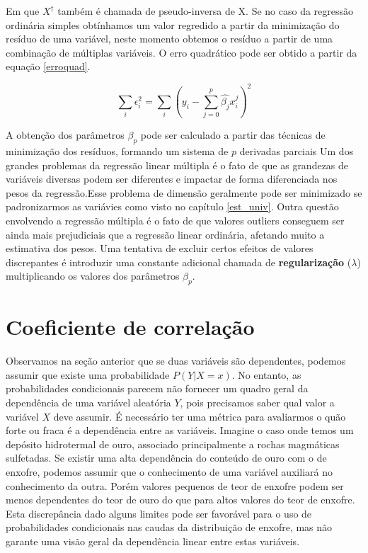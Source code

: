 Em que $X^{\dagger}$ também é chamada de pseudo-inversa de X. Se no caso da regressão ordinária simples obtínhamos um valor regredido a partir da minimização do resíduo de uma variável, neste momento obtemos o resíduo a partir de uma combinação de múltiplas variáveis. O erro quadrático pode ser obtido a partir da equação \eqref{erroquad}. 
  
 
 \begin{equation}\label{erroquad}
 \sum_{i} \epsilon_{i}^2 = \sum_{i} \left( y_{i} - \sum_{j=0}^{p} \hat{\beta_{j}} x^{j}_{i} \right)^{2}
 \end{equation}
 
A obtenção dos parâmetros $\beta_{p}$ pode ser calculado a partir das técnicas de minimização dos resíduos, formando um sistema de $p$ derivadas parciais Um dos grandes problemas da regressão linear múltipla é o fato de que as grandezas de variáveis diversas podem ser diferentes e impactar de forma diferenciada nos pesos da regressão.Esse problema de dimensão geralmente pode ser minimizado se padronizarmos as variávies como visto no capítulo \ref{est_univ}. Outra questão envolvendo a regressão múltipla é o fato de que valores outliers conseguem ser ainda mais prejudiciais que a regressão linear ordinária, afetando muito a estimativa dos pesos. Uma tentativa de excluir certos efeitos de valores discrepantes é introduzir uma constante adicional chamada de \textbf{regularização} ($\lambda$) multiplicando os valores dos parâmetros $\beta_{p}$. 
  
  \section{Coeficiente de correlação }
  
  Observamos na seção anterior que se duas variáveis são dependentes, podemos assumir que existe uma probabilidade $P(Y|X=x)$. No entanto, as probabilidades condicionais parecem não fornecer um quadro geral da dependência de uma variável aleatória $Y$, pois precisamos saber qual valor a variável $X$ deve assumir. É necessário ter uma métrica para avaliarmos o quão forte ou fraca é a dependência entre as variáveis. Imagine o caso onde temos um depósito hidrotermal de ouro, associado principalmente a rochas magmáticas sulfetadas. Se existir uma alta dependência do conteúdo de ouro com o de enxofre, podemos assumir que o conhecimento de uma variável auxiliará no conhecimento da outra. Porém valores pequenos de teor de enxofre podem ser menos dependentes do teor de ouro do que para altos valores do teor de enxofre. Esta discrepância dado alguns limites pode ser favorável para o uso de probabilidades condicionais nas caudas da distribuição de enxofre, mas não garante uma visão geral da dependência linear entre estas variáveis. 
  
